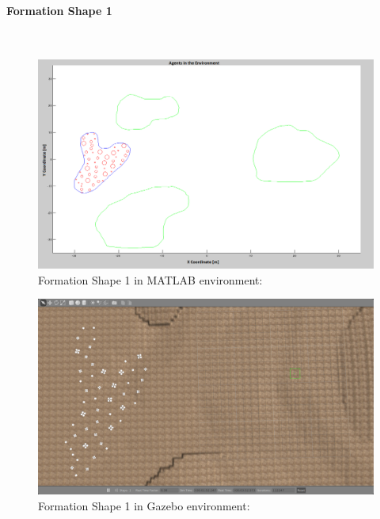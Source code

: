 \documentclass[twoside]{article}
\begin{document}
   \paragraph{Formation Shape 1}\hspace{0pt} \\
		
			\begin{figure}[H]
				\caption{Formation Shape 1 in MATLAB environment:}
				\centerline{\includegraphics[scale = 0.40]{Trajectories_Formation_Shape_1_2}}
			\end{figure} 	
			
				\begin{figure}[H]
					\caption{Formation Shape 1 in Gazebo environment:}
					\centerline{\includegraphics[scale = 0.35]{Trajectories_Formation_Shape_1_1}}
				\end{figure} 	
		
\end{document}

